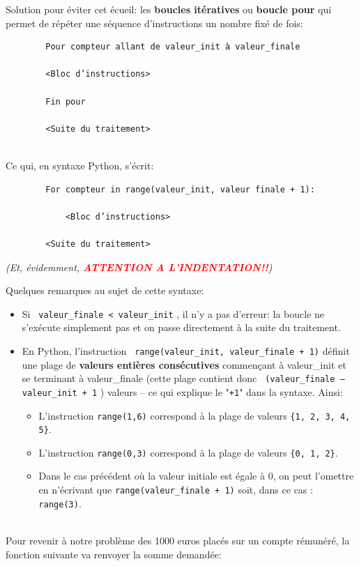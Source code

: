 \documentclass[12pt]{article}
\begin{document}
	Solution pour éviter cet écueil: les \textbf{boucles itératives} ou \textbf{boucle pour} qui permet de répéter une séquence d'instructions un nombre fixé de fois:
	\begin{verbatim}
		Pour compteur allant de valeur_init à valeur_finale
		
		<Bloc d’instructions>
		
		Fin pour		
		
		<Suite du traitement>
	\end{verbatim}
	
	\leavevmode
	\\
	Ce qui, en syntaxe Python, s'écrit:
	
	\begin{verbatim}
		For compteur in range(valeur_init, valeur finale + 1):
		
		    <Bloc d’instructions>
		
		<Suite du traitement>
	\end{verbatim}
	
	\textit{(Et, évidemment, \textcolor{red}{\textbf{ATTENTION A L'INDENTATION!!}})}
	
	Quelques remarques au sujet de cette syntaxe:
	\begin{itemize}
		\item Si \texttt{
				valeur\_finale < valeur\_init}
			, il n’y a pas d'erreur: la boucle ne s’exécute simplement pas et on passe directement à la suite du traitement.
		\item En Python, l’instruction \texttt{
				range(valeur\_init, valeur\_finale + 1)} 
			définit une plage de \textbf{
				valeurs entières consécutives} 
			commençant à valeur\_init et se terminant à valeur\_finale (cette plage contient donc \texttt{
				(valeur\_finale – valeur\_init + 1}
			) valeurs – ce qui explique le "\texttt{+1}" dans la syntaxe. Ainsi:
		\begin{itemize}
			\item L'instruction \texttt{range(1,6)} correspond à la plage de valeurs \texttt{\{1, 2, 3, 4, 5\}}.
			\item L’instruction \texttt{range(0,3)} correspond à la plage de valeurs \texttt{\{0, 1, 2\}}.
			\item Dans le cas précédent où la valeur initiale est égale à 0, on peut l’omettre en n’écrivant que \texttt{range(valeur\_finale + 1)} soit, dans ce cas : \texttt{range(3)}.
		\end{itemize}
	\end{itemize}
	\leavevmode
	\\
	Pour revenir à notre problème des 1000 euros placés sur un compte rémunéré, la fonction suivante va renvoyer la somme demandée:
	
\end{document}
